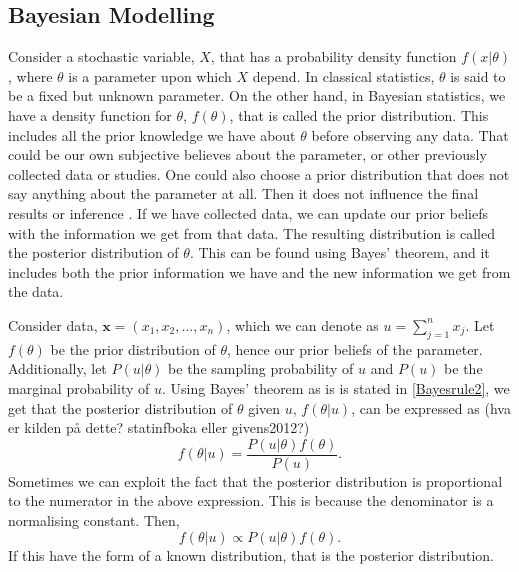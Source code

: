 \subsection{Bayesian Modelling}
Consider a stochastic variable, $X$, that has a probability density function $f(x|\theta)$, where $\theta$ is a parameter upon which $X$ depend. In classical statistics, $\theta$ is said to be a fixed but unknown parameter. On the other hand, in Bayesian statistics, we have a density function for $\theta$, $f(\theta)$, that is called the prior distribution. This includes all the prior knowledge we have about $\theta$ before observing any data. That could be our own subjective believes about the parameter, or other previously collected data or studies. One could also choose a prior distribution that does not say anything about the parameter at all. Then it does not influence the final results or inference \citep{givens2012computational}. 
If we have collected data, we can update our prior beliefs with the information we get from that data. The resulting distribution is called the posterior distribution of $\theta$. This can be found using Bayes' theorem, and it includes both the prior information we have and the new information we get from the data. 

Consider data, $\textbf{x} = (x_1,x_2,...,x_n)$, which we can denote as $u = \sum_{j=1}^n x_j$. Let $f(\theta)$ be the prior distribution of $\theta$, hence our prior beliefs of the parameter. Additionally, let $P(u|\theta)$ be the sampling probability of $u$ and $P(u)$ be the marginal probability of $u$. Using Bayes' theorem as is is stated in \eqref{Bayesrule2}, we get that the posterior distribution of $\theta$ given $u$, $f(\theta|u)$, can be expressed as (hva er kilden på dette? statinfboka eller givens2012?)
\begin{equation*}
    f(\theta|u) = \frac{P(u|\theta)f(\theta)}{P(u)}.
\end{equation*}
Sometimes we can exploit the fact that the posterior distribution is proportional to the numerator in the above expression. This is because the denominator is a normalising constant. Then,
\begin{equation}
    \label{posterior_proportional}
    f(\theta|u) \propto P(u|\theta)f(\theta).
\end{equation}
If this have the form of a known distribution, that is the posterior distribution. 

